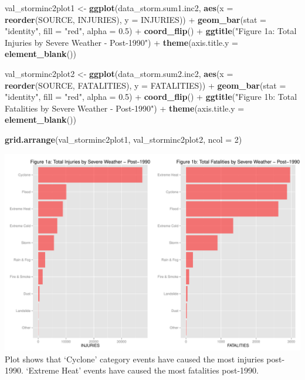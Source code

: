 \documentclass[]{article}
\newenvironment{Shaded}{\begin{snugshade}}{\end{snugshade}}
\newcommand{\KeywordTok}[1]{\textcolor[rgb]{0.13,0.29,0.53}{\textbf{{#1}}}}
\newcommand{\DataTypeTok}[1]{\textcolor[rgb]{0.13,0.29,0.53}{{#1}}}
\newcommand{\DecValTok}[1]{\textcolor[rgb]{0.00,0.00,0.81}{{#1}}}
\newcommand{\FloatTok}[1]{\textcolor[rgb]{0.00,0.00,0.81}{{#1}}}
\newcommand{\StringTok}[1]{\textcolor[rgb]{0.31,0.60,0.02}{{#1}}}
\newcommand{\NormalTok}[1]{{#1}}
\begin{document}
\begin{Shaded}
\begin{Highlighting}[]
\NormalTok{val_storminc2plot1  <-}\StringTok{ }\KeywordTok{ggplot}\NormalTok{(data_storm.sum1.inc2, }\KeywordTok{aes}\NormalTok{(}\DataTypeTok{x =} \KeywordTok{reorder}\NormalTok{(SOURCE, INJURIES), }\DataTypeTok{y =} \NormalTok{INJURIES)) +}
\StringTok{  }\KeywordTok{geom_bar}\NormalTok{(}\DataTypeTok{stat =} \StringTok{"identity"}\NormalTok{, }\DataTypeTok{fill =} \StringTok{"red"}\NormalTok{, }\DataTypeTok{alpha =} \FloatTok{0.5}\NormalTok{) +}
\StringTok{  }\KeywordTok{coord_flip}\NormalTok{() +}
\StringTok{  }\KeywordTok{ggtitle}\NormalTok{(}\StringTok{"Figure 1a: Total Injuries by Severe Weather - Post-1990"}\NormalTok{) +}
\StringTok{  }\KeywordTok{theme}\NormalTok{(}\DataTypeTok{axis.title.y =} \KeywordTok{element_blank}\NormalTok{())}

\NormalTok{val_storminc2plot2  <-}\StringTok{ }\KeywordTok{ggplot}\NormalTok{(data_storm.sum2.inc2, }\KeywordTok{aes}\NormalTok{(}\DataTypeTok{x =} \KeywordTok{reorder}\NormalTok{(SOURCE, FATALITIES), }\DataTypeTok{y =} \NormalTok{FATALITIES)) +}
\StringTok{  }\KeywordTok{geom_bar}\NormalTok{(}\DataTypeTok{stat =} \StringTok{"identity"}\NormalTok{, }\DataTypeTok{fill =} \StringTok{"red"}\NormalTok{, }\DataTypeTok{alpha =} \FloatTok{0.5}\NormalTok{) +}
\StringTok{  }\KeywordTok{coord_flip}\NormalTok{() +}
\StringTok{  }\KeywordTok{ggtitle}\NormalTok{(}\StringTok{"Figure 1b: Total Fatalities by Severe Weather - Post-1990"}\NormalTok{) +}
\StringTok{  }\KeywordTok{theme}\NormalTok{(}\DataTypeTok{axis.title.y =} \KeywordTok{element_blank}\NormalTok{())}

\KeywordTok{grid.arrange}\NormalTok{(val_storminc2plot1, val_storminc2plot2, }\DataTypeTok{ncol =} \DecValTok{2}\NormalTok{)}
\end{Highlighting}
\end{Shaded}

\includegraphics{figure/unnamed-chunk-8-1.pdf} Plot shows that `Cyclone'
category events have caused the most injuries post-1990. `Extreme Heat'
events have caused the most fatalities post-1990.
\end{document}
